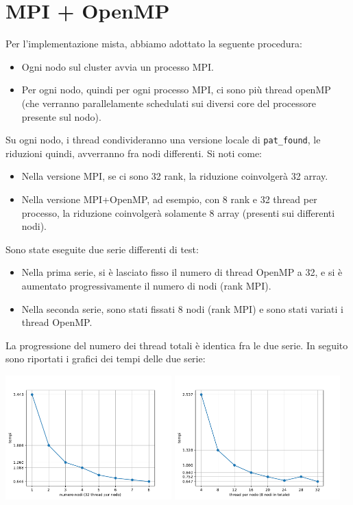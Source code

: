 \documentclass[12pt,openany]{report}
\begin{document}
\section{MPI + OpenMP}
Per l'implementazione mista, abbiamo adottato la seguente procedura:
\begin{itemize}
    \item Ogni nodo sul cluster avvia un processo MPI.
    \item Per ogni nodo, quindi per ogni processo MPI, ci sono più thread openMP (che verranno parallelamente schedulati sui diversi core del processore presente sul nodo).
\end{itemize}
Su ogni nodo, i thread condivideranno una versione locale di \texttt{pat\_found}, le riduzioni quindi, avverranno fra nodi differenti. Si noti come:
\begin{itemize}
    \item Nella versione MPI, se ci sono 32 rank, la riduzione coinvolgerà 32 array.
    \item Nella versione MPI+OpenMP, ad esempio, con 8 rank e 32 thread per processo, la riduzione coinvolgerà solamente 8 array (presenti sui differenti nodi).
\end{itemize}
Sono state eseguite due serie differenti di test:
\begin{itemize}
    \item Nella prima serie, si è lasciato fisso il numero di thread OpenMP a 32, e si è aumentato progressivamente il numero di nodi (rank MPI).
    \item Nella seconda serie, sono stati fissati 8 nodi (rank MPI) e sono stati variati i thread OpenMP.
\end{itemize}
La progressione del numero dei thread totali è identica fra le due serie. In seguito sono riportati i grafici dei tempi delle due serie:
\begin{center}
    \includegraphics[width=0.48\textwidth ]{images/tempi_MISTO_M.pdf}
    \includegraphics[width=0.48\textwidth ]{images/tempi_MISTO_T.pdf}
\end{center}
\end{document}
